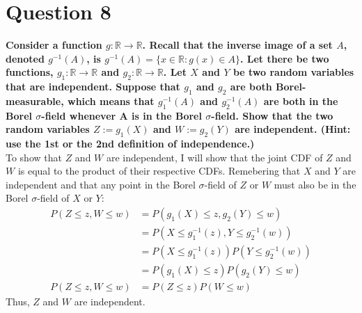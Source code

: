 \documentclass{article}
\newcommand{\R}{\mathbb{R}}
\begin{document}

\section*{Question 8}
\textbf{Consider a function $g:\R\rightarrow\R$. Recall that the inverse image of a set $A$, denoted $g^{-1}(A)$, is $g^{-1}(A)=\{x\in\R:g(x)\in A\}$. Let there be two functions, $g_1 : \R \rightarrow \R$ and $g_2 : \R\rightarrow\R$. Let $X$ and $Y$ be two random variables that are independent. Suppose that $g_1$ and $g_2$ are both Borel-measurable, which means that $g^{-1}_1(A)$ and $g^{-1}_2(A)$ are both in the Borel $\sigma$-field whenever A is in the Borel $\sigma$-field. Show that the two random variables $Z := g_1(X)$ and $W := g_2(Y)$ are independent. (Hint: use the 1st or the 2nd definition of independence.)}
\bigskip \\
To show that $Z$ and $W$ are independent, I will show that the joint CDF of $Z$ and $W$ is equal to the product of their respective CDFs. Remebering that $X$ and $Y$ are independent and that any point in the Borel $\sigma$-field of $Z$ or $W$ must also be in the Borel $\sigma$-field of $X$ or $Y$:
\begin{align*}
	P(Z\leq z, W\leq w) &= P(g_1(X)\leq z, g_2(Y)\leq w)			\\
						&= P(X\leq g_1^{-1}(z), Y\leq g_2^{-1}(w))	\\
						&= P(X\leq g_1^{-1}(z))P(Y\leq g_2^{-1}(w))	\\
						&= P(g_1(X)\leq z)P(g_2(Y)\leq w)			\\
	P(Z\leq z, W\leq w) &= P(Z\leq z)P(W\leq w)
\end{align*}
Thus, $Z$ and $W$ are independent.

\end{document}
